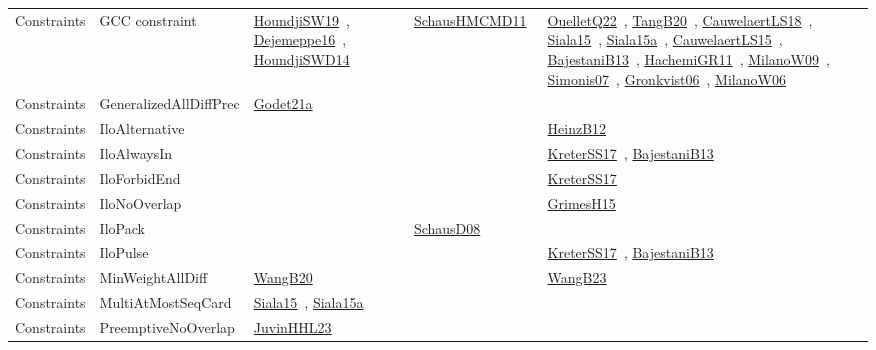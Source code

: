 {\begin{longtable}{lp{3cm}>{\raggedright\arraybackslash}p{6cm}>{\raggedright\arraybackslash}p{6cm}>{\raggedright\arraybackslash}p{8cm}}
Constraints & GCC constraint & \href{../works/HoundjiSW19.pdf}{HoundjiSW19}~\cite{HoundjiSW19}, \href{../works/Dejemeppe16.pdf}{Dejemeppe16}~\cite{Dejemeppe16}, \href{../works/HoundjiSWD14.pdf}{HoundjiSWD14}~\cite{HoundjiSWD14} & \href{../works/SchausHMCMD11.pdf}{SchausHMCMD11}~\cite{SchausHMCMD11} & \href{../works/OuelletQ22.pdf}{OuelletQ22}~\cite{OuelletQ22}, \href{../works/TangB20.pdf}{TangB20}~\cite{TangB20}, \href{../works/CauwelaertLS18.pdf}{CauwelaertLS18}~\cite{CauwelaertLS18}, \href{../works/Siala15.pdf}{Siala15}~\cite{Siala15}, \href{../works/Siala15a.pdf}{Siala15a}~\cite{Siala15a}, \href{../works/CauwelaertLS15.pdf}{CauwelaertLS15}~\cite{CauwelaertLS15}, \href{../works/BajestaniB13.pdf}{BajestaniB13}~\cite{BajestaniB13}, \href{../works/HachemiGR11.pdf}{HachemiGR11}~\cite{HachemiGR11}, \href{../works/MilanoW09.pdf}{MilanoW09}~\cite{MilanoW09}, \href{../works/Simonis07.pdf}{Simonis07}~\cite{Simonis07}, \href{../works/Gronkvist06.pdf}{Gronkvist06}~\cite{Gronkvist06}, \href{../works/MilanoW06.pdf}{MilanoW06}~\cite{MilanoW06}\\
Constraints & GeneralizedAllDiffPrec & \href{../works/Godet21a.pdf}{Godet21a}~\cite{Godet21a} &  & \\
Constraints & IloAlternative &  &  & \href{../works/HeinzB12.pdf}{HeinzB12}~\cite{HeinzB12}\\
Constraints & IloAlwaysIn &  &  & \href{../works/KreterSS17.pdf}{KreterSS17}~\cite{KreterSS17}, \href{../works/BajestaniB13.pdf}{BajestaniB13}~\cite{BajestaniB13}\\
Constraints & IloForbidEnd &  &  & \href{../works/KreterSS17.pdf}{KreterSS17}~\cite{KreterSS17}\\
Constraints & IloNoOverlap &  &  & \href{../works/GrimesH15.pdf}{GrimesH15}~\cite{GrimesH15}\\
Constraints & IloPack &  & \href{../works/SchausD08.pdf}{SchausD08}~\cite{SchausD08} & \\
Constraints & IloPulse &  &  & \href{../works/KreterSS17.pdf}{KreterSS17}~\cite{KreterSS17}, \href{../works/BajestaniB13.pdf}{BajestaniB13}~\cite{BajestaniB13}\\
Constraints & MinWeightAllDiff & \href{../works/WangB20.pdf}{WangB20}~\cite{WangB20} &  & \href{../works/WangB23.pdf}{WangB23}~\cite{WangB23}\\
Constraints & MultiAtMostSeqCard & \href{../works/Siala15.pdf}{Siala15}~\cite{Siala15}, \href{../works/Siala15a.pdf}{Siala15a}~\cite{Siala15a} &  & \\
Constraints & PreemptiveNoOverlap & \href{../works/JuvinHHL23.pdf}{JuvinHHL23}~\cite{JuvinHHL23} &  & \\

\end{longtable}}

